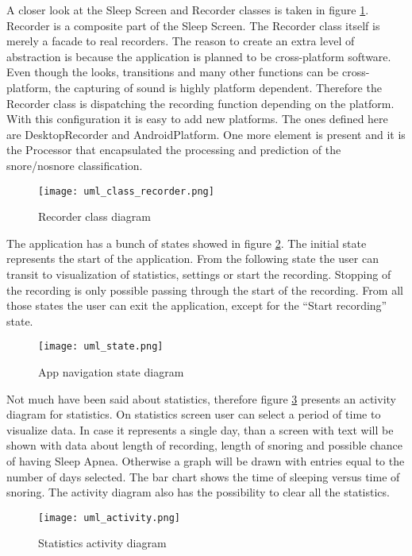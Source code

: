 A closer look at the Sleep Screen and Recorder classes is taken in figure \ref{fig:umlrecorder}. Recorder is a composite part of the Sleep Screen. The Recorder class itself is merely a facade to real recorders. The reason to create an extra level of abstraction is because the application is planned to be cross-platform software. Even though the looks, transitions and many other functions can be cross-platform, the capturing of sound is highly platform dependent. Therefore the Recorder class is dispatching the recording function depending on the platform. With this configuration it is easy to add new platforms. The ones defined here are DesktopRecorder and AndroidPlatform. One more element is present and it is the Processor that encapsulated the processing and prediction of the snore/nosnore classification.

\begin{figure}[!ht]
\centering
  \texttt{[image: uml\_class\_recorder.png]}
\caption{Recorder class diagram}
\label{fig:umlrecorder}
\end{figure}

The application has a bunch of states showed in figure \ref{fig:umlstate}. The initial state represents the start of the application. From the following state the user can transit to visualization of statistics, settings or start the recording. Stopping of the recording is only possible passing through the start of the recording. From all those states the user can exit the application, except for the ``Start recording'' state.

\begin{figure}[!ht]
\centering
  \texttt{[image: uml\_state.png]}
\caption{App navigation state diagram}
\label{fig:umlstate}
\end{figure}

Not much have been said about statistics, therefore figure \ref{fig:umlactivity} presents an activity diagram for statistics. On statistics screen user can select a period of time to visualize data. In case it represents a single day, than a screen with text will be shown with data about length of recording, length of snoring and possible chance of having Sleep Apnea. Otherwise a graph will be drawn with entries equal to the number of days selected. The bar chart shows the time of sleeping versus time of snoring. The activity diagram also has the possibility to clear all the statistics.

\begin{figure}[!ht]
\centering
  \texttt{[image: uml\_activity.png]}
\caption{Statistics activity diagram}
\label{fig:umlactivity}
\end{figure}

